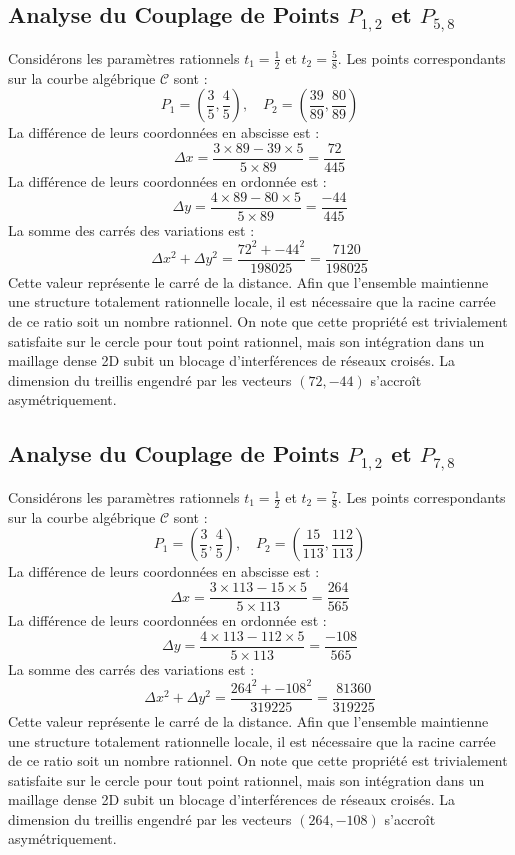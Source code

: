 \documentclass[12pt, a4paper]{article}
\begin{document}
\subsection{Analyse du Couplage de Points $P_{1,2}$ et $P_{5,8}$}
Considérons les paramètres rationnels $t_1 = \frac{1}{2}$ et $t_2 = \frac{5}{8}$.
Les points correspondants sur la courbe algébrique $\mathcal{C}$ sont :
$$ P_1 = \left( \frac{3}{5}, \frac{4}{5} \right), \quad P_2 = \left( \frac{39}{89}, \frac{80}{89} \right) $$
La différence de leurs coordonnées en abscisse est :
$$ \Delta x = \frac{3 \times 89 - 39 \times 5}{5 \times 89} = \frac{72}{445} $$
La différence de leurs coordonnées en ordonnée est :
$$ \Delta y = \frac{4 \times 89 - 80 \times 5}{5 \times 89} = \frac{-44}{445} $$
La somme des carrés des variations est :
$$ \Delta x^2 + \Delta y^2 = \frac{ 72^2 + -44^2 }{ 198025 } = \frac{ 7120 }{ 198025 } $$
Cette valeur représente le carré de la distance. Afin que l'ensemble maintienne une structure totalement rationnelle locale, il est nécessaire que la racine carrée de ce ratio soit un nombre rationnel. On note que cette propriété est trivialement satisfaite sur le cercle pour tout point rationnel, mais son intégration dans un maillage dense 2D subit un blocage d'interférences de réseaux croisés. La dimension du treillis engendré par les vecteurs $( 72, -44 )$ s'accroît asymétriquement.


\subsection{Analyse du Couplage de Points $P_{1,2}$ et $P_{7,8}$}
Considérons les paramètres rationnels $t_1 = \frac{1}{2}$ et $t_2 = \frac{7}{8}$.
Les points correspondants sur la courbe algébrique $\mathcal{C}$ sont :
$$ P_1 = \left( \frac{3}{5}, \frac{4}{5} \right), \quad P_2 = \left( \frac{15}{113}, \frac{112}{113} \right) $$
La différence de leurs coordonnées en abscisse est :
$$ \Delta x = \frac{3 \times 113 - 15 \times 5}{5 \times 113} = \frac{264}{565} $$
La différence de leurs coordonnées en ordonnée est :
$$ \Delta y = \frac{4 \times 113 - 112 \times 5}{5 \times 113} = \frac{-108}{565} $$
La somme des carrés des variations est :
$$ \Delta x^2 + \Delta y^2 = \frac{ 264^2 + -108^2 }{ 319225 } = \frac{ 81360 }{ 319225 } $$
Cette valeur représente le carré de la distance. Afin que l'ensemble maintienne une structure totalement rationnelle locale, il est nécessaire que la racine carrée de ce ratio soit un nombre rationnel. On note que cette propriété est trivialement satisfaite sur le cercle pour tout point rationnel, mais son intégration dans un maillage dense 2D subit un blocage d'interférences de réseaux croisés. La dimension du treillis engendré par les vecteurs $( 264, -108 )$ s'accroît asymétriquement.
\end{document}
